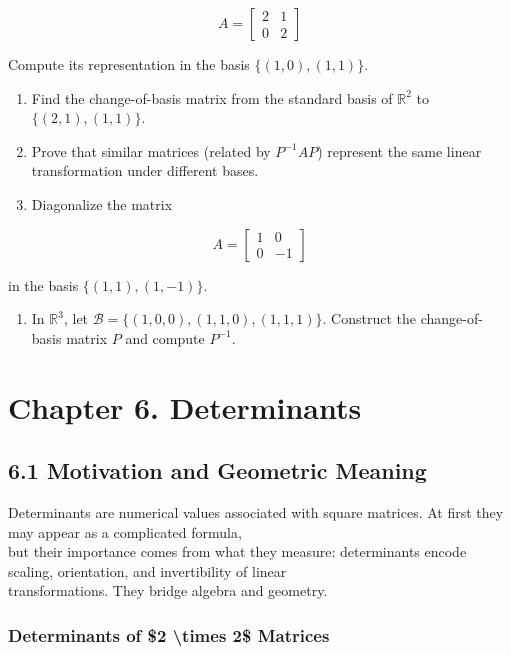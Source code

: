 \documentclass[
  12pt,
  a4paper,
]{article}
\let\oldsection\section
\renewcommand{\section}{\clearpage\oldsection}
\begin{document}
\[A = \begin{bmatrix} 2 & 1 \\ 0 & 2 \end{bmatrix}\]

Compute its representation in the basis \(\{(1,0),(1,1)\}\).

\begin{enumerate}
\def\labelenumi{\arabic{enumi}.}
\item
  Find the change-of-basis matrix from the standard basis of
  \(\mathbb{R}^2\) to \(\{(2,1),(1,1)\}\).
\item
  Prove that similar matrices (related by \(P^{-1}AP\)) represent the
  same linear transformation under different bases.
\item
  Diagonalize the matrix
\end{enumerate}

\[A = \begin{bmatrix} 1 & 0 \\ 0 & -1 \end{bmatrix}\]

in the basis \(\{(1,1),(1,-1)\}\).

\begin{enumerate}
\def\labelenumi{\arabic{enumi}.}
\item
  In \(\mathbb{R}^3\), let
  \(\mathcal{B} = \{(1,0,0),(1,1,0),(1,1,1)\}\). Construct the
  change-of-basis matrix \(P\) and compute \(P^{-1}\).
\end{enumerate}

\section{Chapter 6. Determinants}\label{chapter-6-determinants}

\subsection{6.1 Motivation and Geometric
Meaning}\label{61-motivation-and-geometric-meaning}

Determinants are numerical values associated with square matrices. At
first they may appear as a complicated formula,\\
but their importance comes from what they measure: determinants encode
scaling, orientation, and invertibility of linear\\
transformations. They bridge algebra and geometry.

\subsubsection{Determinants of \$2 \textbackslash times 2\$
Matrices}\label{determinants-of-ux242-times-2ux24-matrices}
\end{document}
